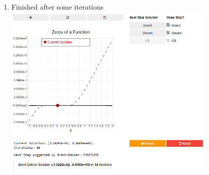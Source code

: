 \begin{enumerate}
    \item Finished after some iterations\\
    \includegraphics[width=0.8\textwidth]{Include/Images/Thesis/Documentation/Visualizers/NonLinear/Example 2/Example 2 - 05 - Finished.png}
\end{enumerate}